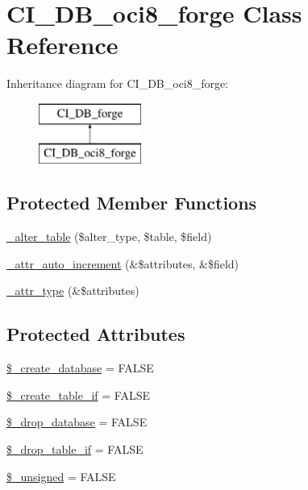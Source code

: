 \hypertarget{class_c_i___d_b__oci8__forge}{}\section{C\+I\+\_\+\+D\+B\+\_\+oci8\+\_\+forge Class Reference}
\label{class_c_i___d_b__oci8__forge}
Inheritance diagram for C\+I\+\_\+\+D\+B\+\_\+oci8\+\_\+forge\+:\begin{figure}[H]
\begin{center}
\leavevmode
\includegraphics[height=2.000000cm]{class_c_i___d_b__oci8__forge}
\end{center}
\end{figure}
\subsection*{Protected Member Functions}
\begin{DoxyCompactItemize}
\item 
\mbox{\hyperlink{class_c_i___d_b__oci8__forge_a41c6cae02f2fda8b429ad0afb9509426}{\+\_\+alter\+\_\+table}} (\$alter\+\_\+type, \$table, \$field)
\item 
\mbox{\hyperlink{class_c_i___d_b__oci8__forge_a2a013a5932439c3c44f0dad3436525f7}{\+\_\+attr\+\_\+auto\+\_\+increment}} (\&\$attributes, \&\$field)
\item 
\mbox{\hyperlink{class_c_i___d_b__oci8__forge_a8553be952084c6f7cdfff370a1d14f6b}{\+\_\+attr\+\_\+type}} (\&\$attributes)
\end{DoxyCompactItemize}
\subsection*{Protected Attributes}
\begin{DoxyCompactItemize}
\item 
\mbox{\hyperlink{class_c_i___d_b__oci8__forge_acd23c9a8735806155f1a5d0a87c151f2}{\$\+\_\+create\+\_\+database}} = F\+A\+L\+SE
\item 
\mbox{\hyperlink{class_c_i___d_b__oci8__forge_a2f6484fcb8d1dc3eef67a637227cd583}{\$\+\_\+create\+\_\+table\+\_\+if}} = F\+A\+L\+SE
\item 
\mbox{\hyperlink{class_c_i___d_b__oci8__forge_a8305b12fc17f6f87778260ebdff287b4}{\$\+\_\+drop\+\_\+database}} = F\+A\+L\+SE
\item 
\mbox{\hyperlink{class_c_i___d_b__oci8__forge_a92a8a9145a7fc91e252e58d019373581}{\$\+\_\+drop\+\_\+table\+\_\+if}} = F\+A\+L\+SE
\item 
\mbox{\hyperlink{class_c_i___d_b__oci8__forge_aae977ae6d61fa183f0b25422b6ddc31c}{\$\+\_\+unsigned}} = F\+A\+L\+SE
\end{DoxyCompactItemize}
